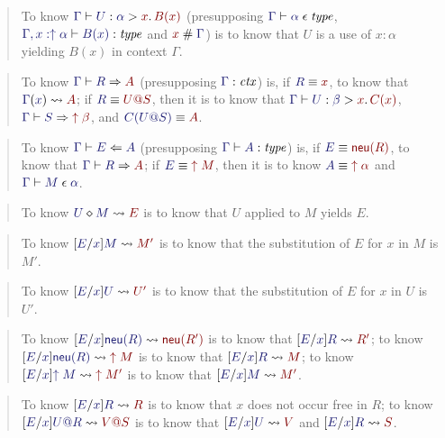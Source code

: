 \documentclass[main.tex]{subfiles}
\begin{document}
\begin{quote}
  To know $\lfsequent\Gamma\useof{U}{\alpha}{x}{B(x)}$ (presupposing
$\lfsequent\Gamma\cantype{\alpha}$, $\lfsequent{\Gamma,x:\ival\alpha}{\type{B(x)}}$ and
$\fresh{x}{\Gamma}$) is to know that $U$ is a use of $x:\alpha$ yielding
$B(x)$ in context $\Gamma$.
\end{quote}\medskip

\begin{quote}
  To know $\lfsequent\Gamma\infers{R}{A}$ (presupposing
$\lfctx\Gamma$) is, if $\match{R}{x}$, to know that
$\hasvar{\Gamma}{x}{A}$; if $\match{R}{\elim{U}{S}}$, then it is to
know that $\lfsequent\Gamma\useof{U}{\beta}{x}{C(x)}$,
$\lfsequent\Gamma\infers{S}{\ival\beta}$, and $\match{C(\elim{U}{S})}{A}$.
\end{quote}\medskip

\begin{quote}
  To know $\lfsequent\Gamma\checks{E}{A}$ (presupposing
$\lfsequent\Gamma\type{A}$) is, if $\match{E}{\ineu{R}}$, to know that
$\lfsequent\Gamma\infers{R}{A}$; if $\match{E}{\ival{M}}$, then it is to know
$\match{A}{\ival\alpha}$ and $\lfsequent\Gamma\valof{M}{\alpha}$.
\end{quote}\medskip

\begin{quote}
  To know $\eapply{U}{M}{E}$ is to know that $U$ applied
to $M$ yields $E$.
\end{quote}\medskip

\begin{quote}
  To know $\hsubste{E}{x}{M}{M'}$ is to know that the substitution of $E$ for $x$ in $M$ is $M'$.
\end{quote}\medskip

\begin{quote}
  To know $\hsubste{E}{x}{U}{U'}$ is to know that the substitution of $E$ for $x$ in $U$ is $U'$.
\end{quote}\medskip

\begin{quote}
  To know $\hsubste{E}{x}{\ineu{R}}{\ineu{R'}}$ is to know that
$\hsubstr{E}{x}{R}{R'}$; to know $\hsubste{E}{x}{\ineu{R}}{\ival{M}}$
is to know that $\hsubstrm{E}{x}{R}{M}$; to know
$\hsubste{E}{x}{\ival{M}}{\ival{M'}}$ is to know that
$\hsubstm{E}{x}{M}{M'}$.
\end{quote}\medskip

\begin{quote}
  To know $\hsubstr{E}{x}{R}{R}$ is to know that $x$ does not occur
free in $R$; to know $\hsubstr{E}{x}{\elim{U}{R}}{\elim{V}{S}}$ is to
know that $\hsubstu{E}{x}{U}{V}$ and $\hsubstr{E}{x}{R}{S}$.
\end{quote}\medskip
\end{document}
